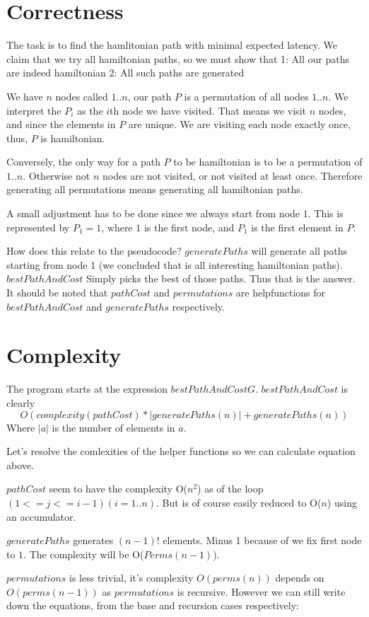 \documentclass[a4paper,11pt]{article}
\begin{document}
\section{Correctness}
The task is to find the hamlitonian path with minimal expected latency.
We claim that we try all hamiltonian paths, so we must show that
1: All our paths are indeed hamiltonian
2: All such paths are generated

We have $n$ nodes called $1..n$, our path $P$ is a permutation of all nodes $1..n$.
We interpret the $P_i$ as the $i$th node we have visited.
That means we visit $n$ nodes, and since the elements in $P$ are unique.
We are visiting each node exactly once, thus, $P$ is hamiltonian.

Conversely, the only way for a path $P$ to be hamiltonian is to be a permutation of $1..n$.
Otherwise not $n$ nodes are not visited, or not visited at least once.
Therefore generating all permutations means generating all hamiltonian paths.

A small adjustment has to be done since we always start from node $1$.
This is represented by $P_1 = 1$, where $1$ is the first node, and $P_1$ is
the first element in $P$.

How does this relate to the pseudocode? $generatePaths$ will generate
all paths starting from node 1 (we concluded that is all interesting
hamiltonian paths). $bestPathAndCost$ Simply picks the best
of those paths. Thus that is the answer. It should be noted that
$pathCost$ and $permutations$ are helpfunctions for
$bestPathAndCost$ and $generatePaths$ respectively.

\section{Complexity}
The program starts at the expression $bestPathAndCost G$.
$bestPathAndCost$ is clearly
$$ O(complexity(pathCost)*|generatePaths(n)|+ generatePaths(n)) $$
Where $|a|$ is the number of elements in $a$.

Let's resolve the comlexities of the helper functions so we can calculate
equation above.

$pathCost$ seem to have the complexity O($n^2$) as of the loop $(1 <= j <= i-1) (i = 1..n)$.
But is of course easily reduced to O($n$) using an accumulator.

$generatePaths$ generates $(n-1)!$ elements. Minus 1 because of we fix first node to $1$. 
The complexity will be O($Perms(n-1)$).

$permutations$ is less trivial, it's complexity $O(perms(n))$ depends on
$O(perms(n-1))$ as $permutations$ is recursive. However we can still write
down the equations, from the base and recursion cases respectively:
\end{document}
